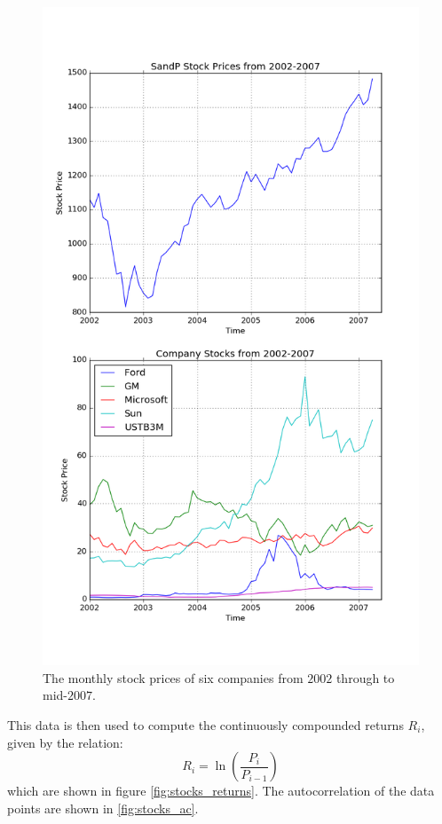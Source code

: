 \message{ !name(austin_report.tex)}\documentclass[11pt, letterpage, twocolumn]{article}
\begin{document}
\begin{figure}
  \includegraphics[width=\linewidth]{stocks_time.png}
  \caption{
    The monthly stock prices of six companies from $2002$ through to mid-$2007$.
  }
  \label{fig:stocks_time}
\end{figure}

This data is then used to compute the continuously compounded returns $R_i$,
given by the relation:
\begin{equation}
  R_i = \ln\left( \frac{P_i}{P_{i-1}} \right)
  \label{ccr}
\end{equation}
which are shown in figure \ref{fig:stocks_returns}. The autocorrelation of the
data points are shown in \ref{fig:stocks_ac}.
\end{document}
